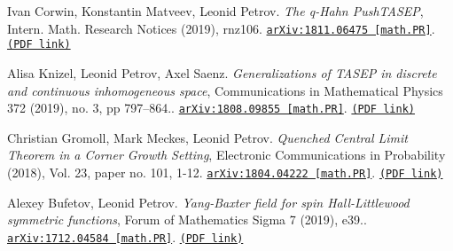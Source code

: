 \documentclass[letterpaper,11pt]{article}
\begin{document}
\begin{etaremune}
\item 
Ivan Corwin, Konstantin Matveev, Leonid Petrov.
\emph{The q-Hahn PushTASEP}, Intern. Math. Research Notices (2019),  rnz106. 
\href{https://arxiv.org/abs/1811.06475}{\texttt{arXiv:1811.06475 [math.PR]}}. \href{https://storage.lpetrov.cc/research_files/Petrov-publ/30-publ-petrov-uva.pdf}{\texttt{(PDF link)}}





\item 
Alisa Knizel, Leonid Petrov, Axel Saenz.
\emph{Generalizations of TASEP in discrete and continuous inhomogeneous space}, Communications in Mathematical Physics 372 (2019), no. 3, pp 797–864.. 
\href{https://arxiv.org/abs/1808.09855}{\texttt{arXiv:1808.09855 [math.PR]}}. \href{https://storage.lpetrov.cc/research_files/Petrov-publ/29-publ-petrov-uva.pdf}{\texttt{(PDF link)}}











\item 
Christian Gromoll, Mark Meckes, Leonid Petrov.
\emph{Quenched Central Limit Theorem in a Corner Growth Setting}, Electronic Communications in Probability (2018), Vol. 23, paper no. 101, 1-12. 
\href{https://arxiv.org/abs/1804.04222}{\texttt{arXiv:1804.04222 [math.PR]}}. \href{https://storage.lpetrov.cc/research_files/Petrov-publ/28-publ-petrov-uva.pdf}{\texttt{(PDF link)}}













\item 
Alexey Bufetov, Leonid Petrov.
\emph{Yang-Baxter field for spin Hall-Littlewood symmetric functions}, Forum of Mathematics Sigma 7 (2019), e39.. 
\href{https://arxiv.org/abs/1712.04584}{\texttt{arXiv:1712.04584 [math.PR]}}. \href{https://storage.lpetrov.cc/research_files/Petrov-publ/27-publ-petrov-uva.pdf}{\texttt{(PDF link)}}














\end{etaremune}
\end{document}
